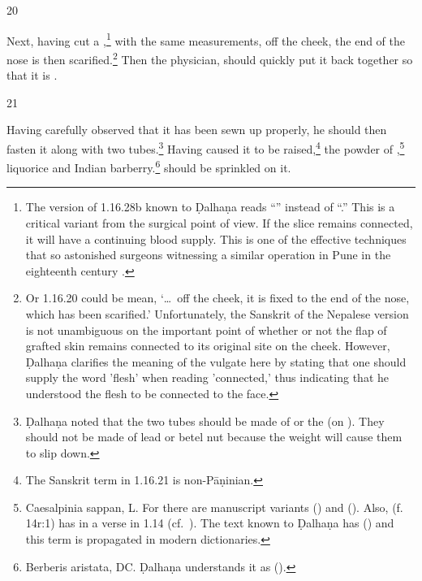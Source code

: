 \begin{translation}
\item[20] 

\begin{sloka}
    Next, having cut a ,\footnote{The
    version of 1.16.28b known to Ḍalhaṇa \citep[81]{vulgate} reads “” instead of “.”
    This is a critical variant from the surgical point of view.  If the slice remains
    connected, it will have a continuing blood supply.  This is one of the effective 
    techniques that so astonished surgeons witnessing a similar operation in Pune in
    the eighteenth century \citep[see][67--70]{wuja-2003}.} with the same
    measurements, off the cheek, the end of the nose is then scarified.\footnote{Or 1.16.20 
    could be mean, 
    `\ldots\ off the cheek, it is fixed to the end of the nose, which has been
    scarified.' Unfortunately, the Sanskrit of the Nepalese version is not unambiguous on the
    important point of whether or not the flap of grafted skin remains connected
    to its original site on the cheek. However, Ḍalhaṇa \citep[81]{vulgate} clarifies the 
    meaning of the vulgate here by stating that one should supply the word 'flesh' when 
    reading 'connected,' thus indicating that he understood the flesh to be connected to the 
    face.} %
%
Then the  physician, 
    should quickly put it back together so that it is 
    .
    \label{well-joined}
\end{sloka}  


\item[21] 
\begin{sloka}
Having carefully observed that it has been sewn up properly, he should then fasten
it along with two tubes.\footnote{Ḍalhaṇa noted that the two tubes should be made
    of  or the  (on ). They should not be made of lead or betel nut because
    the weight will cause them to slip down.} Having caused it to be
    raised,\footnote{The Sanskrit term  in 1.16.21 is non-Pāṇinian.}
        the powder of ,\footnote{Caesalpinia sappan, 
        L. %
            \label{pattanga}
            For  there are manuscript variants 
            () and  ().  Also,  (f.\,14r:1) has  in
            a verse in 1.14 (cf.\ ). The text known to Ḍalhaṇa  has
             () and this term is propagated in modern
            dictionaries.} %
            {liquorice} %
            and Indian barberry.\footnote{Berberis aristata, DC. %
                Ḍalhaṇa understands it as 
                (\cite[81]{vulgate}).} should be sprinkled on it.


\end{sloka}
\end{translation}
